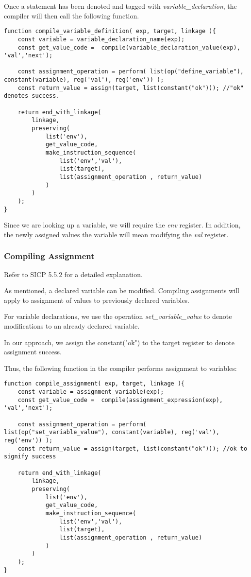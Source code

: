 Once a statement has been denoted and tagged with \textit{variable\_declaration}, the compiler will then call the following function.

\begin{lstlisting}[caption=compile variable declarations]
function compile_variable_definition( exp, target, linkage ){
    const variable = variable_declaration_name(exp);
    const get_value_code =  compile(variable_declaration_value(exp), 'val','next');

    const assignment_operation = perform( list(op("define_variable"), constant(variable), reg('val'), reg('env')) );
    const return_value = assign(target, list(constant("ok"))); //"ok" denotes success.
    
    return end_with_linkage(
        linkage,
        preserving(
            list('env'),
            get_value_code,
            make_instruction_sequence(
                list('env','val'),
                list(target),
                list(assignment_operation , return_value)
            )
        )
    );
}
\end{lstlisting}

Since we are looking up a variable, we will require the \textit{env} register. In addition, the newly assigned values the variable will mean modifying the \textit{val} register.

\subsubsection{Compiling Assignment}
Refer to SICP 5.5.2 for a detailed explanation.

As mentioned, a declared variable can be modified. Compiling assignments will apply to assignment of values to previously declared variables.\newline

For variable declarations, we use the operation \textit{set\_variable\_value} to denote modifications to an already declared variable.\newline

In our approach, we assign the constant("ok") to the target register to denote assignment success.\newline

Thus, the following function in the compiler performs assignment to variables:
\begin{lstlisting}[caption=compile assignment]
function compile_assignment( exp, target, linkage ){
    const variable = assignment_variable(exp);
    const get_value_code =  compile(assignment_expression(exp), 'val','next');

    const assignment_operation = perform( list(op("set_variable_value"), constant(variable), reg('val'), reg('env')) );
    const return_value = assign(target, list(constant("ok"))); //ok to signify success
    
    return end_with_linkage(
        linkage,
        preserving(
            list('env'),
            get_value_code,
            make_instruction_sequence(
                list('env','val'),
                list(target),
                list(assignment_operation , return_value)
            )
        )
    );
}
\end{lstlisting}

